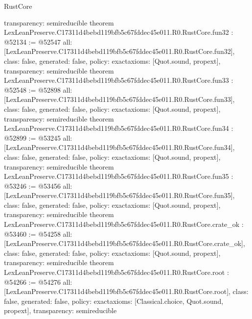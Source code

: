 \begin{lexlean}{RustCore}
\begin{coremodule}
{  transparency: semireducible
}
theorem LexLeanPreserve.C17311d4bebd119bfb5c67fddec45e011.R0.RustCore.fun32 : @52134 := @52547 {
  all: [LexLeanPreserve.C17311d4bebd119bfb5c67fddec45e011.R0.RustCore.fun32],
  class: false,
  generated: false,
  policy: exact{axioms: [Quot.sound, propext]},
  transparency: semireducible
}
theorem LexLeanPreserve.C17311d4bebd119bfb5c67fddec45e011.R0.RustCore.fun33 : @52548 := @52898 {
  all: [LexLeanPreserve.C17311d4bebd119bfb5c67fddec45e011.R0.RustCore.fun33],
  class: false,
  generated: false,
  policy: exact{axioms: [Quot.sound, propext]},
  transparency: semireducible
}
theorem LexLeanPreserve.C17311d4bebd119bfb5c67fddec45e011.R0.RustCore.fun34 : @52899 := @53245 {
  all: [LexLeanPreserve.C17311d4bebd119bfb5c67fddec45e011.R0.RustCore.fun34],
  class: false,
  generated: false,
  policy: exact{axioms: [Quot.sound, propext]},
  transparency: semireducible
}
theorem LexLeanPreserve.C17311d4bebd119bfb5c67fddec45e011.R0.RustCore.fun35 : @53246 := @53456 {
  all: [LexLeanPreserve.C17311d4bebd119bfb5c67fddec45e011.R0.RustCore.fun35],
  class: false,
  generated: false,
  policy: exact{axioms: [Quot.sound, propext]},
  transparency: semireducible
}
theorem LexLeanPreserve.C17311d4bebd119bfb5c67fddec45e011.R0.RustCore.crate_ok : @53460 := @54258 {
  all: [LexLeanPreserve.C17311d4bebd119bfb5c67fddec45e011.R0.RustCore.crate_ok],
  class: false,
  generated: false,
  policy: exact{axioms: [Quot.sound, propext]},
  transparency: semireducible
}
theorem LexLeanPreserve.C17311d4bebd119bfb5c67fddec45e011.R0.RustCore.root : @54266 := @54276 {
  all: [LexLeanPreserve.C17311d4bebd119bfb5c67fddec45e011.R0.RustCore.root],
  class: false,
  generated: false,
  policy: exact{axioms: [Classical.choice, Quot.sound, propext]},
  transparency: semireducible
}


\end{coremodule}
\end{lexlean}
